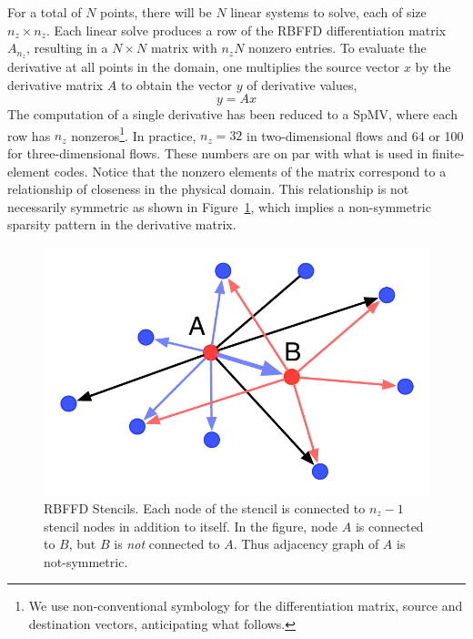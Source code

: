 \documentclass[10pt,conference,compsocconf]{IEEEtran}
\begin{document}
For a total of $N$ points, there will be $N$ linear systems to solve,
each of size $n_z \times n_z$. Each linear solve produces a row of the
RBFFD differentiation matrix $A_{n_z}$, resulting in a $N \times N$
matrix with $n_zN$ nonzero entries. To evaluate the derivative at all
points in the domain, one multiplies the source vector $x$ by the 
derivative matrix $A$ to obtain the vector $y$ of derivative values, 
$$
  y = A x
$$
The computation of a single derivative has been reduced to a SpMV, 
where each row has $n_z$ nonzeros\footnote{We use non-conventional 
symbology for the differentiation matrix, source and destination vectors, 
anticipating what follows.}. 
In practice, $n_z=32$ in two-dimensional flows and 64 or 100 for
three-dimensional flows. These numbers are on par with what is used in
finite-element codes. Notice that the nonzero elements of the matrix
correspond to a relationship of closeness in the physical domain. 
This relationship is not
necessarily symmetric as shown in Figure~\ref{fig:rbf_stencils}, which
implies a non-symmetric sparsity pattern in the derivative matrix. 

\begin{figure}[tbh]
  \centering
  \includegraphics[width=.8\linewidth]{figures/rbf_stencils.pdf}
  \caption{RBFFD Stencils. Each node of the stencil is connected to
    $n_z-1$ stencil nodes in addition to itself. In the figure, node
    $A$ is connected to $B$, but $B$ is {\em not\/} connected to
    $A$. Thus adjacency graph of $A$ is not-symmetric.}
  \label{fig:rbf_stencils}
\end{figure}
\end{document}
